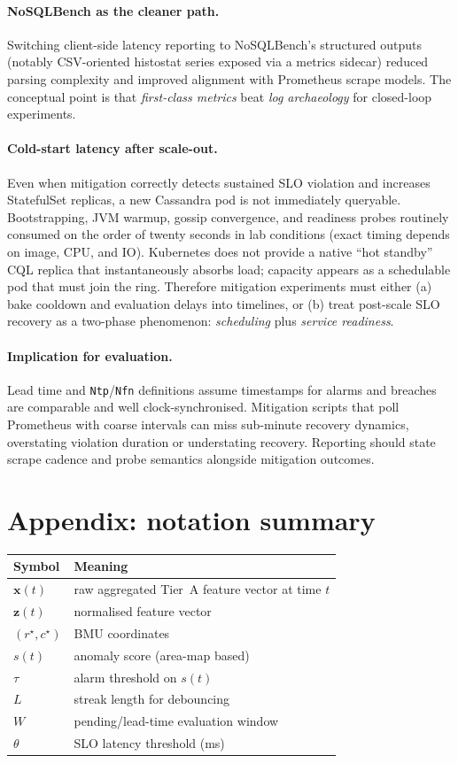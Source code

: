 \documentclass[11pt,a4paper]{article}
\begin{document}
\paragraph{NoSQLBench as the cleaner path.}
Switching client-side latency reporting to NoSQLBench's structured outputs (notably CSV-oriented histostat series exposed via a metrics sidecar) reduced parsing complexity and improved alignment with Prometheus scrape models. The conceptual point is that \emph{first-class metrics} beat \emph{log archaeology} for closed-loop experiments.

\paragraph{Cold-start latency after scale-out.}
Even when mitigation correctly detects sustained SLO violation and increases StatefulSet replicas, a new Cassandra pod is not immediately queryable. Bootstrapping, JVM warmup, gossip convergence, and readiness probes routinely consumed on the order of twenty seconds in lab conditions (exact timing depends on image, CPU, and IO). Kubernetes does not provide a native ``hot standby'' CQL replica that instantaneously absorbs load; capacity appears as a schedulable pod that must join the ring. Therefore mitigation experiments must either (a) bake cooldown and evaluation delays into timelines, or (b) treat post-scale SLO recovery as a two-phase phenomenon: \emph{scheduling} plus \emph{service readiness}.

\paragraph{Implication for evaluation.}
Lead time and \texttt{Ntp}/\texttt{Nfn} definitions assume timestamps for alarms and breaches are comparable and well clock-synchronised. Mitigation scripts that poll Prometheus with coarse intervals can miss sub-minute recovery dynamics, overstating violation duration or understating recovery. Reporting should state scrape cadence and probe semantics alongside mitigation outcomes.

\section*{Appendix: notation summary}
\begin{tabular}{@{}ll@{}}
\toprule
Symbol & Meaning \\
\midrule
$\mathbf{x}(t)$ & raw aggregated Tier~A feature vector at time $t$ \\
$\mathbf{z}(t)$ & normalised feature vector \\
$(r^\star,c^\star)$ & BMU coordinates \\
$s(t)$ & anomaly score (area-map based) \\
$\tau$ & alarm threshold on $s(t)$ \\
$L$ & streak length for debouncing \\
$W$ & pending/lead-time evaluation window \\
$\theta$ & SLO latency threshold (ms) \\
\bottomrule
\end{tabular}
\end{document}
